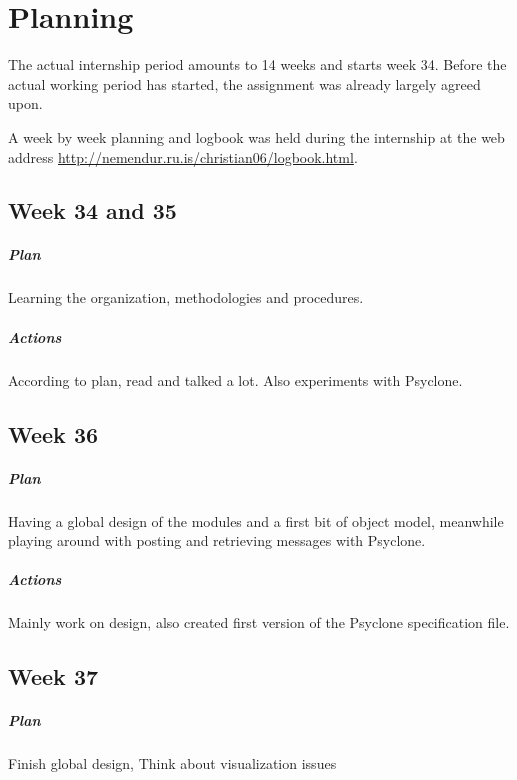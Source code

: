 \chapter{\label{cpt:planning}Planning}

The actual internship period amounts to 14 weeks and starts week 34. Before the
actual working period has started, the assignment was already largely agreed
upon.

A week by week planning and logbook was held during the internship at the web
address \url{http://nemendur.ru.is/christian06/logbook.html}.

\section{Week 34 and 35}

\paragraph{Plan} Learning the organization, methodologies and procedures.

\paragraph{Actions} According to plan, read and talked a lot. Also experiments
with Psyclone.

\section{Week 36}

\paragraph{Plan} Having a global design of the modules and a first bit of
object model, meanwhile playing around with posting and retrieving messages
with Psyclone.

\paragraph{Actions} Mainly work on design, also created first version of the
Psyclone specification file.

\section{Week 37}

\paragraph{Plan} Finish global design, Think about visualization issues

